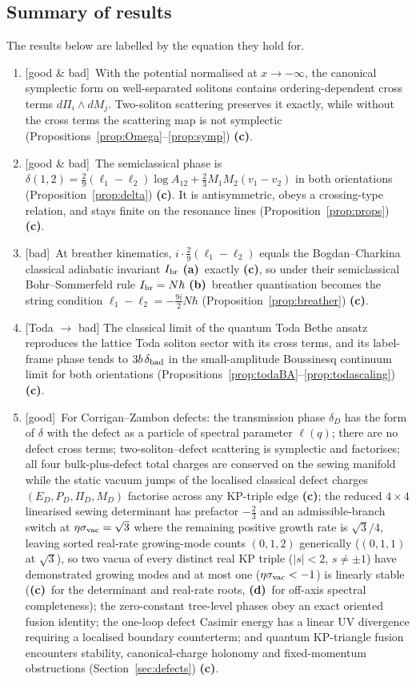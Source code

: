 \documentclass[11pt,a4paper]{article}
\newcommand{\lab}[1]{{\normalfont\sffamily\footnotesize\bfseries(#1)}}
\newcommand{\La}{\lab{a}}
\newcommand{\Lb}{\lab{b}}
\newcommand{\Lc}{\lab{c}}
\newcommand{\Ld}{\lab{d}}
\newcommand{\eqtag}[2]{{\normalfont\sffamily\footnotesize\textcolor{#1}{[#2]}}}
\newcommand{\Good}{\eqtag{teal!70!black}{good}}
\newcommand{\Bad}{\eqtag{red!60!black}{bad}}
\newcommand{\Both}{\eqtag{violet!70!black}{good \& bad}}
\newcommand{\hb}{\hbar}
\theoremstyle{remark}
\begin{document}
\subsection{Summary of results}\label{sec:summary}

The results below are labelled by the equation they hold for.
\begin{enumerate}
\item \Both\ With the potential normalised at $x\to-\infty$, the canonical symplectic form on well-separated solitons contains ordering-dependent cross terms $d\Pi_i\wedge dM_j$. Two-soliton scattering preserves it exactly, while without the cross terms the scattering map is not symplectic (Propositions~\ref{prop:Omega}--\ref{prop:symp}) \Lc.
\item \Both\ The semiclassical phase is $\delta(1,2)=\tfrac29(\ell_1-\ell_2)\log A_{12}+\tfrac23M_1M_2(v_1-v_2)$ in both orientations (Proposition~\ref{prop:delta}) \Lc. It is antisymmetric, obeys a crossing-type relation, and stays finite on the resonance lines (Proposition~\ref{prop:props}) \Lc.
\item \Bad\ At breather kinematics, $i\cdot\tfrac29(\ell_1-\ell_2)$ equals the Bogdan--Charkina classical adiabatic invariant $I_{\rm br}$ \La\ exactly \Lc, so under their semiclassical Bohr--Sommerfeld rule $I_{\rm br}=N\hb$ \Lb\ breather quantisation becomes the string condition $\ell_1-\ell_2=-\tfrac{9i}2N\hb$ (Proposition~\ref{prop:breather}) \Lc.
\item \eqtag{red!60!black}{Toda $\to$ bad} The classical limit of the quantum Toda Bethe ansatz reproduces the lattice Toda soliton sector with its cross terms, and its label-frame phase tends to $3b\,\delta_{\rm bad}$ in the small-amplitude Boussinesq continuum limit for both orientations (Propositions~\ref{prop:todaBA}--\ref{prop:todascaling}) \Lc.
\item \Good\ For Corrigan--Zambon defects: the transmission phase $\delta_D$ has the form of $\delta$ with the defect as a particle of spectral parameter $\ell(q)$; there are no defect cross terms; two-soliton--defect scattering is symplectic and factorises; all four bulk-plus-defect total charges are conserved on the sewing manifold while the static vacuum jumps of the localised classical defect charges $(E_D,P_D,\Pi_D,M_D)$ factorise across any KP-triple edge \Lc; the reduced $4\times4$ linearised sewing determinant has prefactor $-\tfrac23$ and an admissible-branch switch at $\eta\sigma_{\rm vac}=\sqrt3$ where the remaining positive growth rate is $\sqrt3/4$, leaving sorted real-rate growing-mode counts $(0,1,2)$ generically ($(0,1,1)$ at $\sqrt3$), so two vacua of every distinct real KP triple ($|s|<2$, $s\neq\pm1$) have demonstrated growing modes and at most one ($\eta\sigma_{\rm vac}<-1$) is linearly stable (\Lc\ for the determinant and real-rate roots, \Ld\ for off-axis spectral completeness); the zero-constant tree-level phases obey an exact oriented fusion identity; the one-loop defect Casimir energy has a linear UV divergence requiring a localised boundary counterterm; and quantum KP-triangle fusion encounters stability, canonical-charge holonomy and fixed-momentum obstructions (Section~\ref{sec:defects}) \Lc.

\end{enumerate}
\end{document}
